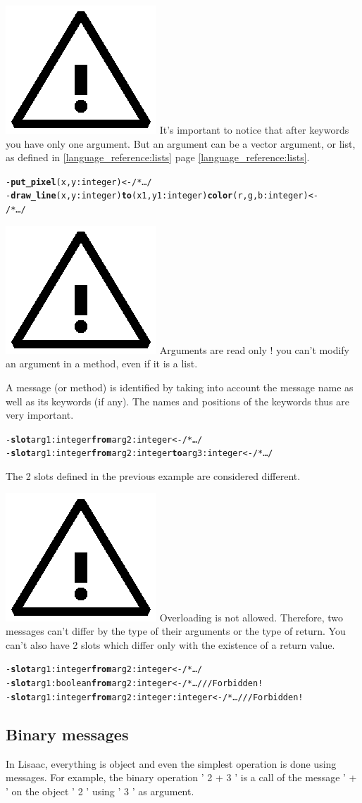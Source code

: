 \documentclass[11pt]{mybook}
\newcommand{\warning}{\includegraphics[scale=0.3]{figures/warning}}
\begin{document}
\warning{} It's important to notice that after keywords you have only one argument.
But an argument can be a vector argument, or {\sc{}list}, as defined in {\ref{language_reference:lists}} page {\ref{language_reference:lists}}.
\begin{alltt}
  - {\bf{}put\_pixel} (x,y:{\sc{}integer}) <- /* \ldots */
  - {\bf{}draw\_line} (x,y:{\sc{}integer}) {\bf{}to} (x1,y1:{\sc{}integer}) {\bf{}color} (r,g,b:{\sc{}integer}) <- 
  /* \ldots */
\end{alltt}

\warning{} Arguments are read only ! you can't modify an argument in a method, even if it is a list.

A message (or method) is identified by taking into account the message name as well as its keywords (if any).
The names and positions of the keywords thus are very important.

\begin{alltt}
  - {\bf{}slot} arg1:{\sc{}integer} {\bf{}from} arg2:{\sc{}integer} <- /* \ldots */
  - {\bf{}slot} arg1:{\sc{}integer} {\bf{}from} arg2:{\sc{}integer} {\bf{}to} arg3:{\sc{}integer} <- /* \ldots */
\end{alltt}

The 2 slots defined in the previous example are considered different.

\warning{} Overloading is not allowed. Therefore, two messages can't differ by the type of their arguments or the type of return. You can't also have 2 slots which differ only with the existence of a return value.

\begin{alltt}
  - {\bf{}slot} arg1:{\sc{}integer} {\bf{}from} arg2:{\sc{}integer} <- /* \ldots */
  - {\bf{}slot} arg1:{\sc{}boolean} {\bf{}from} arg2:{\sc{}integer} <- /* \ldots */  // Forbidden !
  - {\bf{}slot} arg1:{\sc{}integer} {\bf{}from} arg2:{\sc{}integer} :{\sc{}integer} <- /* \ldots */  // Forbidden !
\end{alltt}


\subsection{Binary messages}
\label{language_reference:slot_descriptors:binary_messages}
%
In Lisaac, everything is object and even the simplest operation is done using messages.
For example, the binary operation ' 2 + 3 ' is a call of the message ' + ' on the object ' 2 ' using ' 3 ' as argument.
\end{document}
